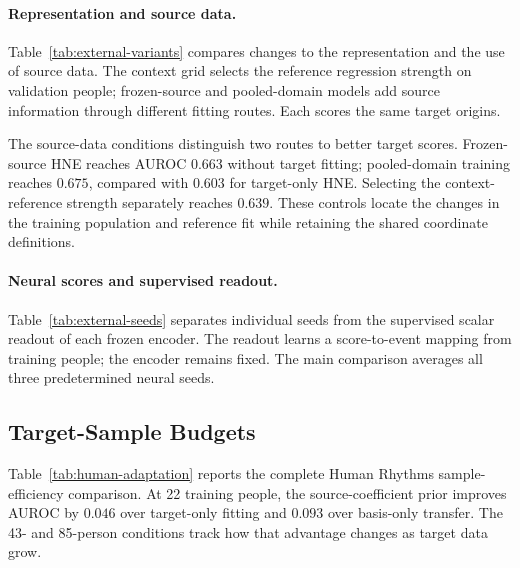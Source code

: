 \paragraph{Representation and source data.}
Table~\ref{tab:external-variants} compares changes to the representation and the use of source data. The context grid selects the reference regression strength on validation people; frozen-source and pooled-domain models add source information through different fitting routes. Each scores the same target origins.
\begin{table}[!htb]
\centering
\caption{Human Rhythms representation and source-data variants.}
\label{tab:external-variants}
\end{table}

The source-data conditions distinguish two routes to better target scores. Frozen-source HNE reaches AUROC $0.663$ without target fitting; pooled-domain training reaches $0.675$, compared with $0.603$ for target-only HNE. Selecting the context-reference strength separately reaches $0.639$. These controls locate the changes in the training population and reference fit while retaining the shared coordinate definitions.

\paragraph{Neural scores and supervised readout.}
Table~\ref{tab:external-seeds} separates individual seeds from the supervised scalar readout of each frozen encoder. The readout learns a score-to-event mapping from training people; the encoder remains fixed. The main comparison averages all three predetermined neural seeds.
\begin{table}[!htb]
\centering
\caption{Human Rhythms seeds. Each cell reports native / supervised scalar-readout scores.}
\label{tab:external-seeds}
\end{table}

\FloatBarrier
\subsection{Target-Sample Budgets}
Table~\ref{tab:human-adaptation} reports the complete Human Rhythms sample-efficiency comparison. At 22 training people, the source-coefficient prior improves AUROC by $0.046$ over target-only fitting and $0.093$ over basis-only transfer. The 43- and 85-person conditions track how that advantage changes as target data grow.
\begin{table}[!htb]
\centering
\caption{Human Rhythms AUROC by target-training budget. Smaller budgets average three fixed subsets.}
\label{tab:human-adaptation}
\end{table}

